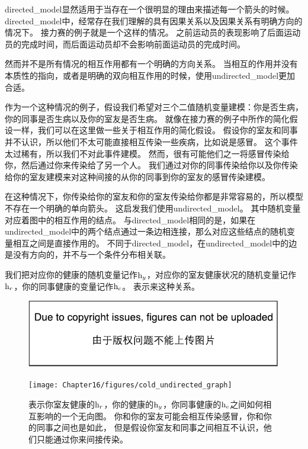\gls{directed_model}显然适用于当存在一个很明显的理由来描述每一个箭头的时候。
\gls{directed_model}中，经常存在我们理解的具有因果关系以及因果关系有明确方向的情况下。
接力赛的例子就是一个这样的情况。
之前运动员的表现影响了后面运动员的完成时间，而后面运动员却不会影响前面运动员的完成时间。


然而并不是所有情况的相互作用都有一个明确的方向关系。
当相互的作用并没有本质性的指向，或者是明确的双向相互作用的时候，使用\gls{undirected_model}更加合适。


作为一个这种情况的例子，假设我们希望对三个二值随机变量建模：你是否生病，你的同事是否生病以及你的室友是否生病。
就像在接力赛的例子中所作的简化假设一样，我们可以在这里做一些关于相互作用的简化假设。
假设你的室友和同事并不认识，所以他们不太可能直接相互传染一些疾病，比如说是感冒。
这个事件太过稀有，所以我们不对此事件建模。
然而，很有可能他们之一将感冒传染给你，然后通过你来传染给了另一个人。
我们通过对你的同事传染给你以及你传染给你的室友建模来对这种间接的从你的同事到你的室友的感冒传染建模。


在这种情况下，你传染给你的室友和你的室友传染给你都是非常容易的，所以模型不存在一个明确的单向箭头。
这启发我们使用\gls{undirected_model}。
其中随机变量对应着图中的相互作用的结点。
与\gls{directed_model}相同的是，如果在\gls{undirected_model}中的两个结点通过一条边相连接，那么对应这些结点的随机变量相互之间是直接作用的。
不同于\gls{directed_model}，在\gls{undirected_model}中的边是没有方向的，并不与一个条件分布相关联。


我们把对应你的健康的随机变量记作$\mathrm{h}_y$，对应你的室友健康状况的随机变量记作$\mathrm{h}_r$，你的同事健康的变量记作$\mathrm{h}_c$。
表示来这种关系。

\begin{figure}[!htb]
\ifOpenSource
\centerline{\includegraphics{figure.pdf}}
\else
	\centerline{\texttt{[image: Chapter16/figures/cold\_undirected\_graph]}}	
\fi
\caption{表示你室友健康的$\mathrm{h}_r$，你的健康的$\mathrm{h}_y$，你同事健康的$\mathrm{h}_c$之间如何相互影响的一个无向图。
你和你的室友可能会相互传染感冒，你和你的同事之间也是如此，
但是假设你室友和同事之间相互不认识，他们只能通过你来间接传染。}
	\label{fig:cold_undirected_graph}
\end{figure}

